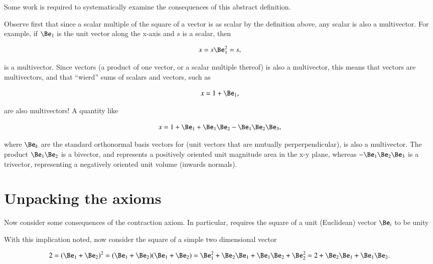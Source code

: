 Some work is required to systematically examine the consequences of this abstract definition.

Observe first that since a scalar multiple of the square of a vector is as scalar by the definition above,
any scalar is also a multivector.  For example, if \( \Be_1 \) is the unit vector along the x-axis and \( s \) is a scalar, then

\begin{equation}\label{eqn:multivector:20}
   x = s \Be_1^2 = s,
\end{equation}

is a multivector.  Since vectors (a product of one vector, or a scalar multiple thereof) is also a multivector, this
means that vectors are multivectors, and that ``wierd'' sums of scalars and vectors, such as

\begin{dmath}\label{eqn:multivector:40}
   x = 1 + \Be_1,
\end{dmath}

are also multivectors!  A quantity like

\begin{dmath}\label{eqn:multivector:45}
   x = 1 + \Be_1 + \Be_1 \Be_2 - \Be_1 \Be_2 \Be_3,
\end{dmath}

where \( \Be_k \) are the standard orthonormal basis vectors for  (unit vectors that are mutually perperpendicular), is also a multivector.  The product \( \Be_1 \Be_2 \) is a bivector, and represents a positively oriented unit magnitude area in the x-y plane, whereas \( - \Be_1 \Be_2 \Be_3 \) is a trivector, representing a negatively oriented unit volume (inwards normals).

\section{Unpacking the axioms}
Now consider some consequences of the contraction axiom.  In particular,
requires the square of a unit (Euclidean) vector \( \Be_i \) to be unity


With this implication noted, now consider the square of a simple two dimensional vector

\begin{dmath}\label{eqn:gaTutorial:80}
2
=
(\Be_1 + \Be_2)^2
= (\Be_1 + \Be_2)(\Be_1 + \Be_2)
= \Be_1^2 + \Be_2 \Be_1 + \Be_1 \Be_2 + \Be_2^2
= 2 + \Be_2 \Be_1 + \Be_1 \Be_2.
\end{dmath}

